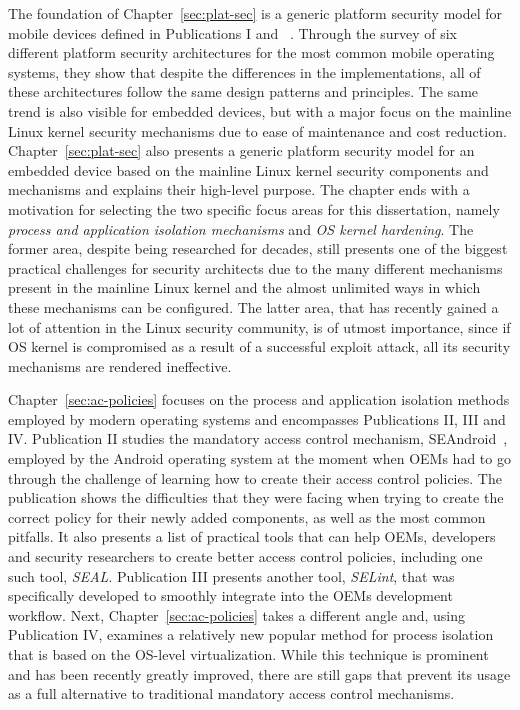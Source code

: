 The foundation of Chapter~\ref{sec:plat-sec} is a generic platform security model for mobile devices defined in Publications I and ~\cite{2013Asokan}. Through the survey of six different platform security architectures for the most common mobile operating systems, they show that despite the differences in the implementations, all of these architectures follow the same design patterns and principles. The same trend is also visible for embedded devices, but with a major focus on the mainline Linux kernel security mechanisms due to ease of maintenance and cost reduction. Chapter~\ref{sec:plat-sec} also presents a generic platform security model for an embedded device based on the mainline Linux kernel security components and mechanisms and explains their high-level purpose. The chapter ends with a motivation for selecting the two specific focus areas for this dissertation, namely \textit{process and application isolation mechanisms} and \textit{OS kernel hardening}. The former area, despite being researched for decades, still presents one of the biggest practical challenges
for security architects due to the many different mechanisms present in the mainline Linux kernel and the almost unlimited ways in which these mechanisms can be configured. The latter area, that has recently gained a lot of attention in the Linux security community, is of utmost importance, since if OS kernel is compromised as a result of a successful exploit attack, all its security mechanisms are rendered ineffective.

Chapter~\ref{sec:ac-policies} focuses on the process and application isolation methods employed by modern operating systems and encompasses Publications II, III and IV. Publication II studies the mandatory access control mechanism, SEAndroid~\cite{smalley12}, employed by the Android operating system at the moment when OEMs had to go through the challenge of learning how to create their access control policies. The publication shows the difficulties that they were facing when trying to create the correct policy for their newly added components, as well as the most common pitfalls. It also presents a list of practical tools that can help OEMs, developers and security researchers to create better access control policies, including one such tool, \textit{SEAL}. Publication III presents another tool, \textit{SELint}, that was specifically developed to smoothly integrate into the OEMs development workflow. Next, Chapter~\ref{sec:ac-policies} takes a different angle and, using Publication IV, examines a relatively new popular method for process isolation that is based on the OS-level virtualization. While this technique is prominent and has been recently greatly improved, there are still gaps that prevent its usage as a full alternative to traditional mandatory access control mechanisms.

